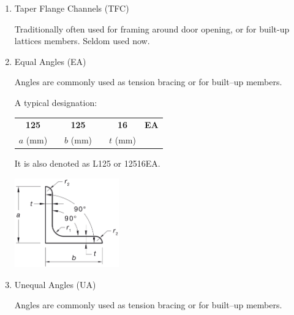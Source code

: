 \begin{enumerate}[itemsep=1em]
\begin{minipage}[t]{5cm}
\end{minipage}
\item Taper Flange Channels (TFC)\\[1em]
\begin{minipage}[t]{9cm}
Traditionally often used for framing around door opening, or for built-up lattices members. Seldom used now.
\end{minipage}\hfill
\begin{minipage}[t]{5cm}
\centering
\end{minipage}
\item Equal Angles (EA)\\[1em]
\begin{minipage}[t]{9cm}
Angles are commonly used as tension bracing or for built--up members.

A typical designation:
\begin{table}[H]\centering
\begin{tabular}{cccccc}
	 \textbf{125}  & \textbf{\texttimes} &  \textbf{125}  & \textbf{\texttimes} &  \textbf{16}   & \textbf{EA} \\
	$a$ (\si{\mm}) &                     & $b$ (\si{\mm}) &                     & $t$ (\si{\mm}) &
\end{tabular}
\end{table}

It is also denoted as L125 or 125\texttimes16EA.
\end{minipage}\hfill
\begin{minipage}[t]{5cm}
\centering\includegraphics[width=4.5cm,valign=t]{PIC/CH02/EA}
\end{minipage}
\item Unequal Angles (UA)\\[1em]
\begin{minipage}[t]{9cm}
Angles are commonly used as tension bracing or for built--up members.


\end{minipage}
\end{enumerate}
